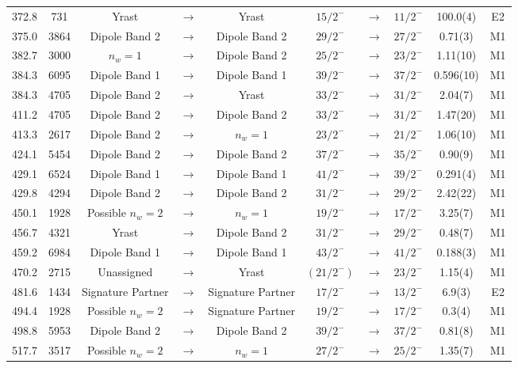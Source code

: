 \begin{landscape}
\begin{center}
\begin{longtable}{|c|c|ccc|ccc|c|c|}
 372.8&731&Yrast&$ \rightarrow $&Yrast&$ 15/2^{-} $&$ \rightarrow $&$ 11/2^{-} $& 100.0(4)& E2 \\
 375.0&3864&Dipole Band 2&$ \rightarrow $&Dipole Band 2&$ 29/2^{-} $&$ \rightarrow $&$ 27/2^{-} $& 0.71(3)& M1 \\
 382.7&3000&$n_w=1$&$ \rightarrow $&Dipole Band 2&$ 25/2^{-} $&$ \rightarrow $&$ 23/2^{-} $& 1.11(10)& M1 \\
 384.3&6095&Dipole Band 1&$ \rightarrow $&Dipole Band 1&$ 39/2^{-} $&$ \rightarrow $&$ 37/2^{-} $& 0.596(10)& M1 \\
 384.3&4705&Dipole Band 2&$ \rightarrow $&Yrast&$ 33/2^{-} $&$ \rightarrow $&$ 31/2^{-} $& 2.04(7)& M1 \\
 411.2&4705&Dipole Band 2&$ \rightarrow $&Dipole Band 2&$ 33/2^{-} $&$ \rightarrow $&$ 31/2^{-} $& 1.47(20)& M1 \\
 413.3&2617&Dipole Band 2&$ \rightarrow $&$n_w=1$&$ 23/2^{-} $&$ \rightarrow $&$ 21/2^{-} $& 1.06(10)& M1 \\
 424.1&5454&Dipole Band 2&$ \rightarrow $&Dipole Band 2&$ 37/2^{-} $&$ \rightarrow $&$ 35/2^{-} $& 0.90(9)& M1 \\
 429.1&6524&Dipole Band 1&$ \rightarrow $&Dipole Band 1&$ 41/2^{-} $&$ \rightarrow $&$ 39/2^{-} $& 0.291(4)& M1 \\
 429.8&4294&Dipole Band 2&$ \rightarrow $&Dipole Band 2&$ 31/2^{-} $&$ \rightarrow $&$ 29/2^{-} $& 2.42(22)& M1 \\
 450.1&1928&Possible $n_w=2$&$ \rightarrow $&$n_w=1$&$ 19/2^{-} $&$ \rightarrow $&$ 17/2^{-} $& 3.25(7)& M1 \\
 456.7&4321&Yrast&$ \rightarrow $&Dipole Band 2&$ 31/2^{-} $&$ \rightarrow $&$ 29/2^{-} $& 0.48(7)& M1 \\
 459.2&6984&Dipole Band 1&$ \rightarrow $&Dipole Band 1&$ 43/2^{-} $&$ \rightarrow $&$ 41/2^{-} $& 0.188(3)& M1 \\
 470.2&2715&Unassigned&$ \rightarrow $&Yrast&$ (21/2^{-}) $&$ \rightarrow $&$ 23/2^{-} $& 1.15(4)& M1 \\
 481.6&1434&Signature Partner&$ \rightarrow $&Signature Partner&$ 17/2^{-} $&$ \rightarrow $&$ 13/2^{-} $& 6.9(3)& E2 \\
 494.4&1928&Possible $n_w=2$&$ \rightarrow $&Signature Partner&$ 19/2^{-} $&$ \rightarrow $&$ 17/2^{-} $& 0.3(4)& M1 \\
 498.8&5953&Dipole Band 2&$ \rightarrow $&Dipole Band 2&$ 39/2^{-} $&$ \rightarrow $&$ 37/2^{-} $& 0.81(8)& M1 \\
 517.7&3517&Possible $n_w=2$&$ \rightarrow $&$n_w=1$&$ 27/2^{-} $&$ \rightarrow $&$ 25/2^{-} $& 1.35(7)& M1 \\

\end{longtable}
\end{center}
\end{landscape}
